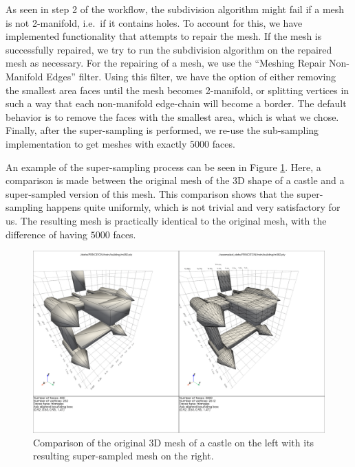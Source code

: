 As seen in step 2 of the workflow, the subdivision algorithm might fail if a mesh is not 2-manifold, i.e.\ if it
contains holes.
To account for this, we have implemented functionality that attempts to repair the mesh.
If the mesh is successfully repaired, we try to run the subdivision algorithm on the repaired mesh as necessary.
For the repairing of a mesh, we use the ``Meshing Repair Non-Manifold Edges'' filter.
Using this filter, we have the option of either removing the smallest area faces until the mesh becomes 2-manifold,
or splitting vertices in such a way that each non-manifold edge-chain will become a border.
The default behavior is to remove the faces with the smallest area, which is what we chose.
Finally, after the super-sampling is performed, we re-use the sub-sampling implementation to get meshes with exactly
$5000$ faces.

An example of the super-sampling process can be seen in Figure \ref{fig:resampled_castle}.
Here, a comparison is made between the original mesh of the 3D shape of a castle and a super-sampled version of this
mesh.
This comparison shows that the super-sampling happens quite uniformly, which is not trivial and very satisfactory for
us.
The resulting mesh is practically identical to the original mesh, with the difference of having $5000$ faces.

\begin{figure}[ht]
  \includegraphics[width=\linewidth]
  {assets/preprocessing/resampling/castle_resampled.png}
  \caption{Comparison of the original 3D mesh of a castle on the left with its resulting super-sampled mesh on the right.}
  \label{fig:resampled_castle}
\end{figure}

